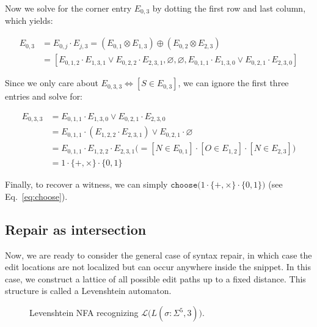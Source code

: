 \documentclass[sigplan,acmsmall,nonacm,screen]{acmart}\settopmatter{printfolios=false,printccs=false,printacmref=false}
\begin{document}
\noindent Now we solve for the corner entry $E_{0, 3}$ by dotting the first row and last column, which yields:\vspace{-8pt}

\begin{align*}
  E_{0, 3} &= E_{0, j} \cdot E_{j, 3} = (E_{0, 1} \otimes E_{1, 3}) \oplus (E_{0, 2} \otimes E_{2, 3})\\
  &= [E_{0, 1, 2} \cdot E_{1, 3, 1} \lor E_{0, 2, 2} \cdot E_{2, 3, 1}, \varnothing, \varnothing, E_{0, 1, 1} \cdot E_{1, 3, 0} \lor E_{0, 2, 1} \cdot E_{2, 3, 0}]
\end{align*}

\noindent Since we only care about $E_{0, 3, 3} \Leftrightarrow [S \in E_{0, 3}]$, we can ignore the first three entries and solve for:\vspace{-8pt}

\begin{align*}
  E_{0, 3, 3} &= E_{0, 1, 1} \cdot E_{1, 3, 0} \lor E_{0, 2, 1} \cdot E_{2, 3, 0}\\
  &= E_{0, 1, 1} \cdot (E_{1, 2, 2} \cdot E_{2, 3, 1}) \lor E_{0, 2, 1} \cdot \varnothing\\
  &= E_{0, 1, 1} \cdot E_{1, 2, 2} \cdot E_{2, 3, 1} \big(= [N \in E_{0, 1}] \cdot [O \in E_{1, 2}] \cdot [N \in E_{2, 3}]\big)\\
  &= 1 \cdot \{+, \times\} \cdot \{0, 1\}
\end{align*}

\noindent Finally, to recover a witness, we can simply $\texttt{choose}\big(1 \cdot \{+, \times\} \cdot \{0, 1\}\big)$  (see Eq.~\ref{eq:choose}).

\subsection{Repair as intersection}\label{sec:repair_ex}

Now, we are ready to consider the general case of syntax repair, in which case the edit locations are not localized but can occur anywhere inside the snippet. In this case, we construct a lattice of all possible edit paths up to a fixed distance. This structure is called a Levenshtein automaton.

\begin{figure}
  \vspace{-0.3cm}
  \begin{center}
    
  \end{center}
  \caption{Levenshtein NFA recognizing $\mathcal{L}\big(L(\sigma: \Sigma^5, 3)\big)$.}\label{fig:lev_nfa}
  \vspace{-0.5cm}
\end{figure}
\end{document}
